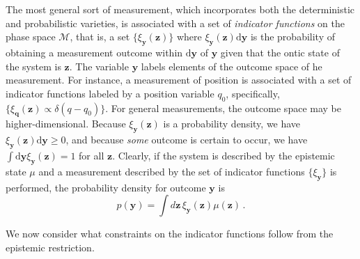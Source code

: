 \documentclass[pra,superscriptaddress,nofootinbib,12pt]{revtex4-2}
\begin{document}
The most general sort of measurement, which incorporates both the deterministic and probabilistic varieties, is associated with a set of \emph{indicator functions} on the phase space $\mathcal{M}$, that is, a set $\{ \xi_{\mathbf{y}}(\mathbf{z}) \}$ where $\xi_{\mathbf{y}}(\mathbf{z})\textrm{d}{\mathbf{y}}$ is the probability of obtaining a measurement outcome within $\textrm{d}\mathbf{y}$ of $\mathbf{y}$ given that the ontic state of the system is $\mathbf{z}$.  The variable $\mathbf{y}$ labels elements of the outcome space of he measurement. For instance, a measurement of position is associated with a set of indicator functions labeled by a position variable $q_0$, specifically, $\{ \xi_{\mathbf{q}}(\mathbf{z}) \propto \delta(q-q_0) \}$. For general measurements, the outcome space may be higher-dimensional.   Because $\xi_{\mathbf{y}}(\mathbf{z})$ is a probability density, we have $\xi_{\mathbf{y}}(\mathbf{z})\textrm{d}\mathbf{y} \ge 0$, and because \emph{some} outcome is certain to occur, we have $\int \textrm{d}\mathbf{y} \xi_{\mathbf{y}}(\mathbf{z}) =1$ for all $\mathbf{z}$.
Clearly, if the system is described by the epistemic state $\mu$ and a measurement described by the set of indicator functions $\{\xi_{\mathbf{y}} \}$ is performed, the probability density for outcome $\mathbf{y}$ is
\begin{equation}
p(\mathbf{y}) = \int d\mathbf{z}\, \xi_{\mathbf{y}}(\mathbf{z}) \mu(\mathbf{z}) \,.
\end{equation}

We now consider what constraints on the indicator functions follow from the epistemic restriction.
\end{document}
